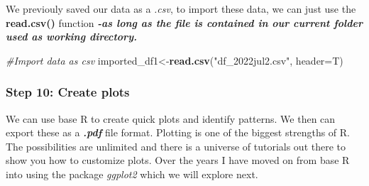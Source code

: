 \documentclass[]{article}
\newenvironment{Shaded}{\begin{snugshade}}{\end{snugshade}}
\newcommand{\CommentTok}[1]{\textcolor[rgb]{0.56,0.35,0.01}{\textit{#1}}}
\newcommand{\DataTypeTok}[1]{\textcolor[rgb]{0.13,0.29,0.53}{#1}}
\newcommand{\KeywordTok}[1]{\textcolor[rgb]{0.13,0.29,0.53}{\textbf{#1}}}
\newcommand{\NormalTok}[1]{#1}
\newcommand{\StringTok}[1]{\textcolor[rgb]{0.31,0.60,0.02}{#1}}
\begin{document}
We previouly saved our data as a \emph{.csv}, to import these data, we
can just use the \textbf{read.csv()} function \textbf{\emph{-as long as
the file is contained in our current folder used as working directory.}}

\begin{Shaded}
\begin{Highlighting}[]
\CommentTok{#Import data as csv}
\NormalTok{imported_df1<-}\KeywordTok{read.csv}\NormalTok{(}\StringTok{"df_2022jul2.csv"}\NormalTok{, }\DataTypeTok{header=}\NormalTok{T)}
\end{Highlighting}
\end{Shaded}

\hypertarget{step-10-create-plots}{%
\subsubsection{Step 10: Create plots}\label{step-10-create-plots}}

We can use base R to create quick plots and identify patterns. We then
can export these as a \textbf{\emph{.pdf}} file format. Plotting is one
of the biggest strengths of R. The possibilities are unlimited and there
is a universe of tutorials out there to show you how to customize plots.
Over the years I have moved on from base R into using the package
\emph{ggplot2} which we will explore next.
\end{document}
